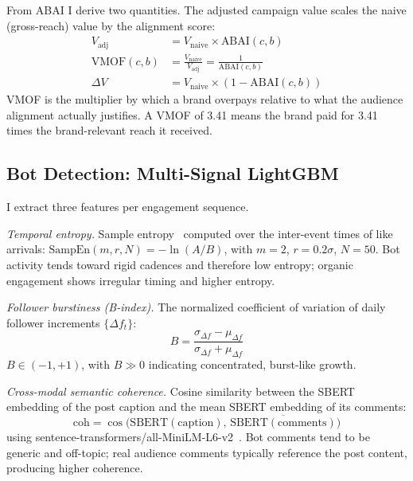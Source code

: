 \documentclass[conference]{IEEEtran}
\begin{document}
From ABAI I derive two quantities. The adjusted campaign value scales
the naive (gross-reach) value by the alignment score:
\begin{align}
  V_{\text{adj}} &= V_{\text{naive}} \times \text{ABAI}(c,b) \label{eq:vadj}\\
  \text{VMOF}(c,b) &= \frac{V_{\text{naive}}}{V_{\text{adj}}} = \frac{1}{\text{ABAI}(c,b)} \label{eq:vmof}\\
  \Delta V &= V_{\text{naive}} \times (1 - \text{ABAI}(c,b)) \label{eq:gap}
\end{align}
VMOF is the multiplier by which a brand overpays relative to what the
audience alignment actually justifies. A VMOF of 3.41 means the brand
paid for 3.41 times the brand-relevant reach it received.

\subsection{Bot Detection: Multi-Signal LightGBM}

I extract three features per engagement sequence.

\textit{Temporal entropy.} Sample entropy~\cite{richman2000} computed over
the inter-event times of like arrivals: $\text{SampEn}(m, r, N) = -\ln(A/B)$,
with $m\!=\!2$, $r\!=\!0.2\sigma$, $N\!=\!50$. Bot activity tends toward
rigid cadences and therefore low entropy; organic engagement shows irregular
timing and higher entropy.

\textit{Follower burstiness (B-index).} The normalized coefficient of
variation of daily follower increments $\{\Delta f_t\}$:
\begin{equation}
  B = \frac{\sigma_{\Delta f} - \mu_{\Delta f}}{\sigma_{\Delta f} + \mu_{\Delta f}}
  \label{eq:burstiness}
\end{equation}
$B \in (-1,+1)$, with $B \gg 0$ indicating concentrated, burst-like growth.

\textit{Cross-modal semantic coherence.} Cosine similarity between the
SBERT embedding of the post caption and the mean SBERT embedding of its
comments:
\begin{equation}
  \text{coh} = \cos\!\bigl(\text{SBERT}(\text{caption}),\,
               \overline{\text{SBERT}(\text{comments})}\bigr)
  \label{eq:coherence}
\end{equation}
using sentence-transformers/all-MiniLM-L6-v2~\cite{reimers2019}. Bot
comments tend to be generic and off-topic; real audience comments
typically reference the post content, producing higher coherence.
\end{document}
